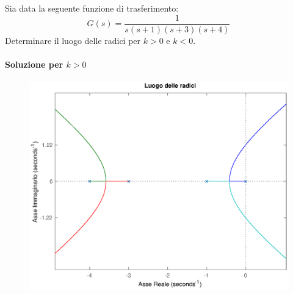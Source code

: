 \exercise{}
Sia data la seguente funzione di trasferimento:
\[
	G(s) = \frac{1}{s(s+1)(s+3)(s+4)}
\]
Determinare il luogo delle radici per \(k>0\) e \(k<0\).

\paragraph{Soluzione per \(k > 0\)}

\begin{figure}[ht]
	\centering
	\includegraphics[scale=.6]{mod1/assets/rl_ex38}
\end{figure}

